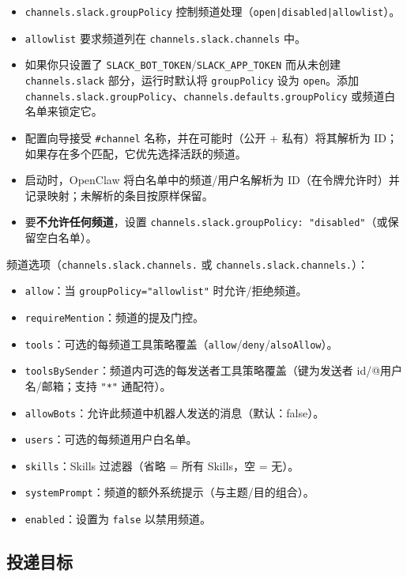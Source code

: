 \begin{itemize}
  \item \texttt{channels.slack.groupPolicy} 控制频道处理（\texttt{open|disabled|allowlist}）。
  \item \texttt{allowlist} 要求频道列在 \texttt{channels.slack.channels} 中。
  \item 如果你只设置了 \texttt{SLACK\_BOT\_TOKEN}/\texttt{SLACK\_APP\_TOKEN} 而从未创建 \texttt{channels.slack} 部分，运行时默认将 \texttt{groupPolicy} 设为 \texttt{open}。添加 \texttt{channels.slack.groupPolicy}、\texttt{channels.defaults.groupPolicy} 或频道白名单来锁定它。
  \item 配置向导接受 \texttt{\#channel} 名称，并在可能时（公开 + 私有）将其解析为 ID；如果存在多个匹配，它优先选择活跃的频道。
  \item 启动时，OpenClaw 将白名单中的频道/用户名解析为 ID（在令牌允许时）并记录映射；未解析的条目按原样保留。
  \item 要\textbf{不允许任何频道}，设置 \texttt{channels.slack.groupPolicy: "disabled"}（或保留空白名单）。
\end{itemize}


频道选项（\texttt{channels.slack.channels.} 或 \texttt{channels.slack.channels.}）：

\begin{itemize}
  \item \texttt{allow}：当 \texttt{groupPolicy="allowlist"} 时允许/拒绝频道。
  \item \texttt{requireMention}：频道的提及门控。
  \item \texttt{tools}：可选的每频道工具策略覆盖（\texttt{allow}/\texttt{deny}/\texttt{alsoAllow}）。
  \item \texttt{toolsBySender}：频道内可选的每发送者工具策略覆盖（键为发送者 id/@用户名/邮箱；支持 \texttt{"*"} 通配符）。
  \item \texttt{allowBots}：允许此频道中机器人发送的消息（默认：false）。
  \item \texttt{users}：可选的每频道用户白名单。
  \item \texttt{skills}：Skills 过滤器（省略 = 所有 Skills，空 = 无）。
  \item \texttt{systemPrompt}：频道的额外系统提示（与主题/目的组合）。
  \item \texttt{enabled}：设置为 \texttt{false} 以禁用频道。
\end{itemize}


\subsection{投递目标}


